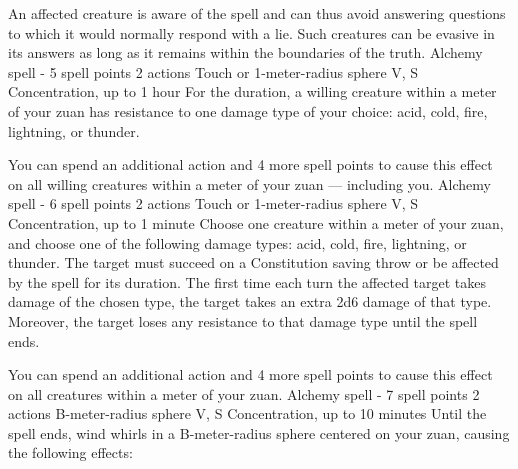         An affected creature is aware of the spell and can thus avoid answering questions to which it would normally respond with a lie.
        Such creatures can be evasive in its answers as long as it remains within the boundaries of the truth.
        {Alchemy spell - 5 spell points}
        {2 actions}
        {Touch or 1-meter-radius sphere}
        {V, S}
        {Concentration, up to 1 hour}
        For the duration, a willing creature within a meter of your zuan has resistance to one damage type of your choice: acid, cold, fire, lightning, or thunder.

        You can spend an additional action and 4 more spell points to cause this effect on all willing creatures within a meter of your zuan --- including you.
        {Alchemy spell - 6 spell points}
        {2 actions}
        {Touch or 1-meter-radius sphere}
        {V, S}
        {Concentration, up to 1 minute}
        Choose one creature within a meter of your zuan, and choose one of the following damage types: acid, cold, fire, lightning, or thunder.
        The target must succeed on a Constitution saving throw or be affected by the spell for its duration.
        The first time each turn the affected target takes damage of the chosen type, the target takes an extra 2d6 damage of that type.
        Moreover, the target loses any resistance to that damage type until the spell ends.

        You can spend an additional action and 4 more spell points to cause this effect on all creatures within a meter of your zuan.
        {Alchemy spell - 7 spell points}
        {2 actions}
        {B-meter-radius sphere}
        {V, S}
        {Concentration, up to 10 minutes}
        Until the spell ends, wind whirls in a B-meter-radius sphere centered on your zuan, causing the following effects:

